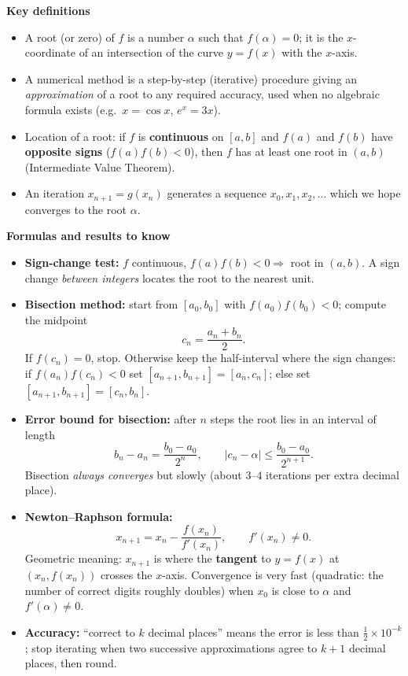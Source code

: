 \documentclass[11pt]{article}
\newcommand{\cle}[1]{{\popxbold\color{popdark}#1}}
\begin{document}
\begin{bilan}
\textbf{Key definitions}
\begin{itemize}
\item A \cle{root} (or zero) of $f$ is a number $\alpha$ such that $f(\alpha)=0$; it is the $x$-coordinate of an intersection of the curve $y=f(x)$ with the $x$-axis.
\item A \cle{numerical method} is a step-by-step (iterative) procedure giving an \emph{approximation} of a root to any required accuracy, used when no algebraic formula exists (e.g.\ $x=\cos x$, $e^x=3x$).
\item \cle{Location of a root}: if $f$ is \textbf{continuous} on $[a,b]$ and $f(a)$ and $f(b)$ have \textbf{opposite signs} ($f(a)f(b)<0$), then $f$ has at least one root in $(a,b)$ (Intermediate Value Theorem).
\item An \cle{iteration} $x_{n+1}=g(x_n)$ generates a sequence $x_0,x_1,x_2,\dots$ which we hope converges to the root $\alpha$.
\end{itemize}

\textbf{Formulas and results to know}
\begin{itemize}
\item \textbf{Sign-change test:} $f$ continuous, $f(a)f(b)<0 \Rightarrow$ root in $(a,b)$. A sign change \emph{between integers} locates the root to the nearest unit.
\item \textbf{Bisection method:} start from $[a_0,b_0]$ with $f(a_0)f(b_0)<0$; compute the midpoint
\[ c_n=\frac{a_n+b_n}{2}. \]
If $f(c_n)=0$, stop. Otherwise keep the half-interval where the sign changes: if $f(a_n)f(c_n)<0$ set $[a_{n+1},b_{n+1}]=[a_n,c_n]$; else set $[a_{n+1},b_{n+1}]=[c_n,b_n]$.
\item \textbf{Error bound for bisection:} after $n$ steps the root lies in an interval of length
\[ b_n-a_n=\frac{b_0-a_0}{2^n}, \qquad |c_n-\alpha|\le \frac{b_0-a_0}{2^{n+1}}. \]
Bisection \emph{always converges} but slowly (about $3$--$4$ iterations per extra decimal place).
\item \textbf{Newton--Raphson formula:}
\[ x_{n+1}=x_n-\frac{f(x_n)}{f'(x_n)}, \qquad f'(x_n)\neq 0. \]
Geometric meaning: $x_{n+1}$ is where the \textbf{tangent} to $y=f(x)$ at $(x_n,f(x_n))$ crosses the $x$-axis. Convergence is very fast (quadratic: the number of correct digits roughly doubles) when $x_0$ is close to $\alpha$ and $f'(\alpha)\neq0$.
\item \textbf{Accuracy:} ``correct to $k$ decimal places'' means the error is less than $\tfrac12\times10^{-k}$; stop iterating when two successive approximations agree to $k+1$ decimal places, then round.
\end{itemize}


\end{bilan}
\end{document}
